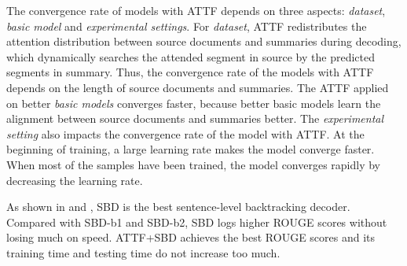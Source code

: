 The convergence rate of models with ATTF depends on three aspects:
{\em dataset}, {\em basic model} and {\em experimental settings}.
For {\em dataset}, ATTF redistributes the attention distribution between source documents and summaries during decoding,
which dynamically searches the attended segment in source by the predicted segments in summary.
Thus, the convergence rate of the models with ATTF depends on the length of source documents and summaries.
The ATTF applied on better {\em basic models} converges faster,
because better basic models learn the alignment between source documents and summaries better.
The {\em experimental setting} also impacts the convergence rate of the model with ATTF.
At the beginning of training, a large learning rate makes the model converge faster. 
When most of the samples have been trained, 
the model converges rapidly by decreasing the learning rate.

As shown in  and , 
SBD is the best sentence-level backtracking decoder.
Compared with SBD-b1 and SBD-b2,
SBD logs higher ROUGE scores without losing much on speed. 
ATTF+SBD achieves the best ROUGE scores 
and its training time and testing time do not increase too much.




